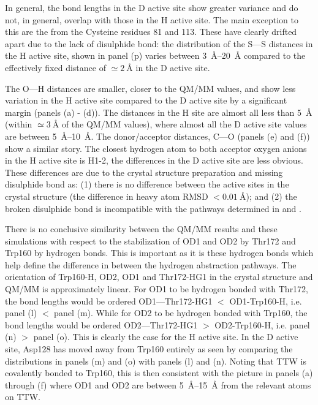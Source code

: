 In general, the bond lengths in the D active site show greater variance and do not, in general, overlap with those in the H active site. The main exception to this are the from the Cysteine residues 81 and 113. These have clearly drifted apart due to the lack of disulphide bond: the distribution of the S---S distances in the H active site, shown in panel (p) varies between \SIrange{3}{20}{\angstrom} compared to the effectively fixed distance of $\simeq \SI{2}{\angstrom}$ in the D active site. 

The O---H distances are smaller, closer to the QM/MM values, and show less variation in the H active site compared to the D active site by a significant margin (panels (a) - (d)). The distances in the H site are almost all less than \SI{5}{\angstrom} (within $\simeq\SI{3}{\angstrom}$ of the QM/MM values), where almost all the D active site values are between \SIrange{5}{10}{\angstrom}. The donor/acceptor distances, C---O (panels (e) and (f)) show a similar story. The closest hydrogen atom to both acceptor oxygen anions in the H active site is H1-2, the differences in the D active site are less obvious. These differences are due to the crystal structure preparation and missing disulphide bond as: (1) there is no difference between the active sites in the crystal structure (the difference in heavy atom RMSD  $<\SI{0.01}{\angstrom}$); and (2) the broken disulphide bond is incompatible with the pathways determined in \cite{masgrauTunnelingClassicalPaths2007}
and \cite{ranaghanInitioQMMM2017}. 

There is no conclusive similarity between the QM/MM results and these simulations with respect to the stabilization of OD1 and OD2 by Thr172 and Trp160 by hydrogen bonds. This is important as it is these hydrogen bonds which help define the difference in between the hydrogen abstraction pathways. The orientation of Trp160-H, OD2, OD1 and Thr172-HG1 in the crystal structure and QM/MM is approximately linear. For OD1 to be hydrogen bonded with Thr172, the bond lengths would be ordered OD1---Thr172-HG1 $<$ OD1-Trp160-H, i.e. panel (l) $<$ panel (m). While for OD2 to be hydrogen bonded with Trp160, the bond lengths would be ordered OD2---Thr172-HG1 $>$ OD2-Trp160-H, i.e. panel (n) $>$ panel (o). This is clearly the case for the H active site. In the D active site, Asp128 has moved away from Trp160 entirely as seen by comparing the distributions in  panels (m) and (o)  with panels (l) and (n). Noting that TTW is covalently bonded to Trp160, this is then consistent with the picture in panels (a) through (f) where OD1 and OD2 are between \SIrange{5}{15}{\angstrom} from the relevant atoms on TTW.  

